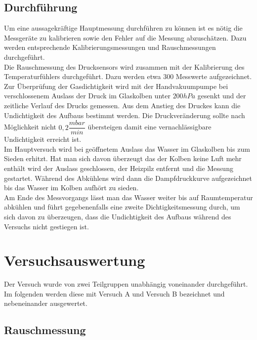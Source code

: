 \documentclass[12pt,a4paper]{article}
\begin{document}
\subsection{Durchführung}

Um eine aussagekräftige Hauptmessung durchführen zu können ist es nötig die Messgeräte zu kalibrieren sowie den Fehler auf die Messung abzuschätzen. Dazu werden entsprechende Kalibrierungsmessungen und Rauschmessungen durchgeführt.\\

Die Rauschmessung des Drucksensors wird zusammen mit der Kalibrierung des Temperaturfühlers durchgeführt. Dazu werden etwa $300$ Messwerte aufgezeichnet.\\
Zur Überprüfung der Gasdichtigkeit wird mit der Handvakuumpumpe bei verschlossenem Auslass der Druck im Glaskolben unter $200hPa$ gesenkt und der zeitliche Verlauf des Drucks gemessen. Aus dem Anstieg des Druckes kann die Undichtigkeit des Aufbaus bestimmt werden. Die Druckveränderung sollte nach Möglichkeit nicht $0,2 \dfrac{mbar}{min}$ übersteigen damit eine vernachlässigbare Undichtigkeit erreicht ist. \\

Im Hauptversuch wird bei geöffnetem Auslass das Wasser im Glaskolben bis zum Sieden erhitzt. Hat man sich davon überzeugt das der Kolben keine Luft mehr enthält wird der Auslass geschlossen, der Heizpilz entfernt und die Messung gestartet. Während des Abkühlens wird dann die Dampfdruckkurve aufgezeichnet bis das Wasser im Kolben aufhört zu sieden.\\
Am Ende des Messvorgangs lässt man das Wasser weiter bis auf Raumtemperatur abkühlen und führt gegebenenfalls eine zweite Dichtigkeitsmessung durch, um sich davon zu überzeugen, dass die Undichtigkeit des Aufbaus während des Versuchs nicht gestiegen ist. 

\section{Versuchsauswertung}
Der Versuch wurde von zwei Teilgruppen unabhängig voneinander durchgeführt. Im folgenden werden diese mit \glqq Versuch A \grqq und \glqq Versuch B \grqq bezeichnet und nebeneinander ausgewertet.



\subsection{Rauschmessung}
\end{document}
